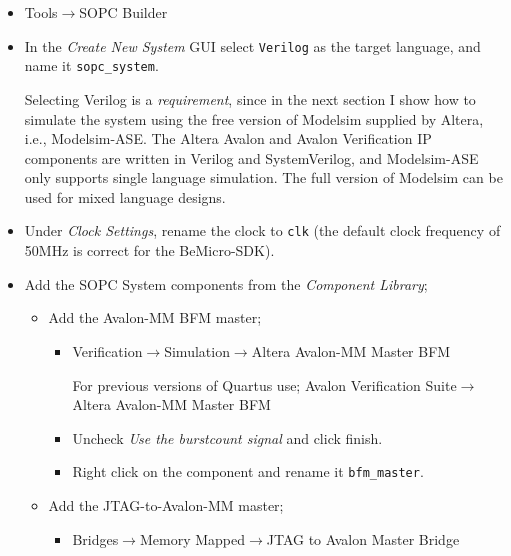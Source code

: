 \documentclass[10pt,twoside]{article}
\begin{document}
\begin{itemize}
\item Tools$\rightarrow$SOPC Builder
\item In the {\em Create New System} GUI select \verb+Verilog+ as
the target language, and name it \verb+sopc_system+.

Selecting Verilog is a {\em requirement}, since in the next section
I show how to simulate the system using the free version of Modelsim
supplied by Altera, i.e., Modelsim-ASE.
The Altera Avalon and Avalon Verification IP components are
written in Verilog and SystemVerilog, and Modelsim-ASE only supports
single language simulation. The full version of Modelsim can be used
for mixed language designs.

\item Under {\em Clock Settings}, rename the clock to \verb+clk+
(the default clock frequency of 50MHz is correct for the BeMicro-SDK).
%
\item Add the SOPC System components from the {\em Component Library};
\begin{itemize}
%
\item Add the Avalon-MM BFM master;
\begin{itemize}
\item Verification$\rightarrow$Simulation$\rightarrow$Altera Avalon-MM Master BFM

For previous versions of Quartus use;\newline
Avalon Verification Suite$\rightarrow$Altera Avalon-MM Master BFM
\item Uncheck {\em Use the burstcount signal} and click finish.
\item Right click on the component and rename it \verb+bfm_master+.
\end{itemize}
%
\item Add the JTAG-to-Avalon-MM master;
\begin{itemize}
\item Bridges$\rightarrow$Memory Mapped$\rightarrow$JTAG to Avalon Master Bridge


\end{itemize}
\end{itemize}
\end{itemize}
\end{document}
